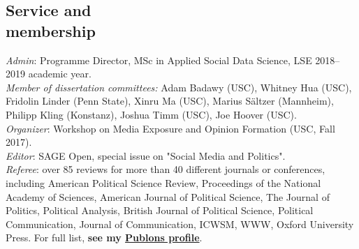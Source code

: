 \documentclass[margin,line,11pt]{resume}
\newcommand{\nl}{\vspace{0.10in}\\}
\begin{document}
\begin{resume}
                \section{\mysidestyle Service and\\membership}
                
\emph{Admin}: Programme Director, MSc in Applied Social Data Science, LSE 2018--2019 academic year.\nl                
\emph{Member of dissertation committees:} Adam Badawy (USC), Whitney Hua (USC), Fridolin Linder (Penn State), Xinru Ma (USC), Marius S\"{a}ltzer (Mannheim), Philipp Kling (Konstanz), Joshua Timm (USC), Joe Hoover (USC).\nl
\emph{Organizer}: Workshop on Media Exposure and Opinion Formation (USC, Fall 2017).\nl
\emph{Editor}: SAGE Open, special issue on "Social Media and Politics".\nl
\emph{Referee}: over 85 reviews for more than 40 different journals or conferences, including American Political Science Review, Proceedings of the National Academy of Sciences, American Journal of Political Science, The Journal of Politics, Political Analysis, British Journal of Political Science,  Political Communication, Journal of Communication, ICWSM, WWW, Oxford University Press. For full list, \textbf{see my \href{https://publons.com/author/1291880/pablo-barbera}{Publons profile}}.\nl

\end{resume}
\end{document}
